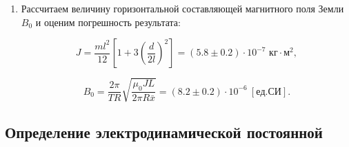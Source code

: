 \documentclass[a4paper, 12pt]{article}
\begin{document}
\begin{enumerate}
        \item Рассчитаем величину горизонтальной составляющей магнитного поля Земли $B_0$ и оценим погрешность результата:

        $$
        J = \frac{ml^2}{12} \left[ 1 + 3 \left( \frac{d}{2l} \right)^2 \right] = \left( 5.8 \pm 0.2 \right) \cdot 10^{-7} \text{ кг} \cdot \text{м}^2,
        $$

        $$
        B_0 = \frac{2\pi}{TR}\sqrt{\frac{\mu_0 JL}{2\pi R\bar{x}}} = \left( 8.2 \pm 0.2 \right) \cdot 10^{-6} \ [ед. СИ].
        $$    
    \end{enumerate}

    \subsection{Определение электродинамической постоянной}
\end{document}
